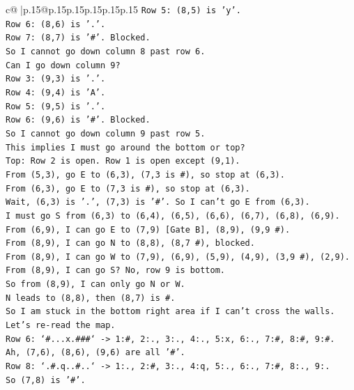 \documentclass{article}
\begin{document}
{\begin{supertabular}{c@{$\;$}|p{.15\linewidth}@{}p{.15\linewidth}p{.15\linewidth}p{.15\linewidth}p{.15\linewidth}p{.15\linewidth}}
{{{\texttt{Row 5: (8,5) is 'y'.} \\
\texttt{Row 6: (8,6) is '.'.} \\
\texttt{Row 7: (8,7) is '\#'. Blocked.} \\
\texttt{So I cannot go down column 8 past row 6.} \\
\texttt{Can I go down column 9?} \\
\texttt{Row 3: (9,3) is '.'.} \\
\texttt{Row 4: (9,4) is 'A'.} \\
\texttt{Row 5: (9,5) is '.'.} \\
\texttt{Row 6: (9,6) is '\#'. Blocked.} \\
\texttt{So I cannot go down column 9 past row 5.} \\
\texttt{This implies I must go around the bottom or top?} \\
\texttt{Top: Row 2 is open. Row 1 is open except (9,1).} \\
\texttt{From (5,3), go E to (6,3), (7,3 is \#), so stop at (6,3).} \\
\texttt{From (6,3), go E to (7,3 is \#), so stop at (6,3).} \\
\texttt{Wait, (6,3) is '.', (7,3) is '\#'. So I can't go E from (6,3).} \\
\texttt{I must go S from (6,3) to (6,4), (6,5), (6,6), (6,7), (6,8), (6,9).} \\
\texttt{From (6,9), I can go E to (7,9) {[}Gate B{]}, (8,9), (9,9 \#).} \\
\texttt{From (8,9), I can go N to (8,8), (8,7 \#), blocked.} \\
\texttt{From (8,9), I can go W to (7,9), (6,9), (5,9), (4,9), (3,9 \#), (2,9).} \\
\texttt{From (8,9), I can go S? No, row 9 is bottom.} \\
\texttt{So from (8,9), I can only go N or W.} \\
\texttt{N leads to (8,8), then (8,7) is \#.} \\
\texttt{So I am stuck in the bottom right area if I can't cross the walls.} \\
\texttt{Let's re{-}read the map.} \\
\texttt{Row 6: `\#...x.\#\#\#` {-}> 1:\#, 2:., 3:., 4:., 5:x, 6:., 7:\#, 8:\#, 9:\#.} \\
\texttt{Ah, (7,6), (8,6), (9,6) are all '\#'.} \\
\texttt{Row 8: `.\#.q..\#..` {-}> 1:., 2:\#, 3:., 4:q, 5:., 6:., 7:\#, 8:., 9:.} \\
\texttt{So (7,8) is '\#'.} \\
}}}
\end{supertabular}}
\end{document}
